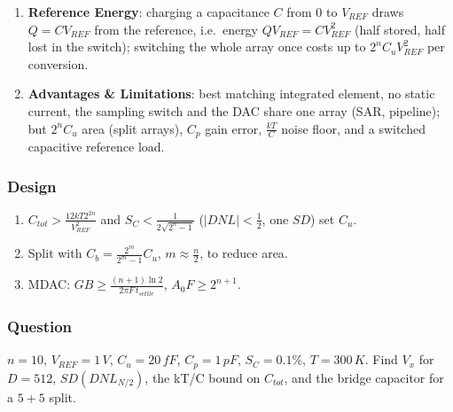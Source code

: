 \begin{enumerate}
    \paragraph{At Reference:} purely capacitive, \(Z_{REF} = \frac{1}{s C_{on}}\) with \(C_{on} = D C_u\): a code dependent
    charge \(\propto D\) drawn at every switching (reference must settle).
    \paragraph{At Output:} array: high impedance (top plate, no static path); MDAC: op-amp output.
  \item \textbf{Reference Energy}: charging a capacitance \(C\) from 0 to \(V_{REF}\) draws \(Q = CV_{REF}\) from the reference,
    i.e.\ energy \(QV_{REF} = CV_{REF}^2\) (half stored, half lost in the switch); switching the whole array once costs
    up to \(2^n C_u V_{REF}^2\) per conversion.
  \item \textbf{Advantages \& Limitations}: best matching integrated element, no static current, the
    sampling switch and the DAC share one array (SAR, pipeline); but \(2^n C_u\) area (split arrays),
    \(C_p\) gain error, \(\frac{kT}{C}\) noise floor, and a switched capacitive reference load.
\end{enumerate}

\subsubsection{Design}
\begin{enumerate}
  \item \(C_{tot} > \frac{12 kT 2^{2n}}{V_{REF}^2}\) and \(S_C < \frac{1}{2\sqrt{2^n - 1}}\) (\(|DNL| < \frac{1}{2}\), one \(SD\)) set \(C_u\).
  \item Split with \(C_b = \frac{2^m}{2^m - 1} C_u\), \(m \approx \frac{n}{2}\), to reduce area.
  \item MDAC: \(GB \geq \frac{(n + 1)\ln 2}{2\pi F\, t_{settle}}\), \(A_0 F \geq 2^{n+1}\).
\end{enumerate}

\subsubsection{Question}
\(n = 10\), \(V_{REF} = 1\,V\), \(C_u = 20\,fF\), \(C_p = 1\,pF\), \(S_C = 0.1\%\),
\(T = 300\,K\). Find \(V_x\) for \(D = 512\), \(SD(DNL_{N/2})\), the kT/C bound on
\(C_{tot}\), and the bridge capacitor for a \(5 + 5\) split.
